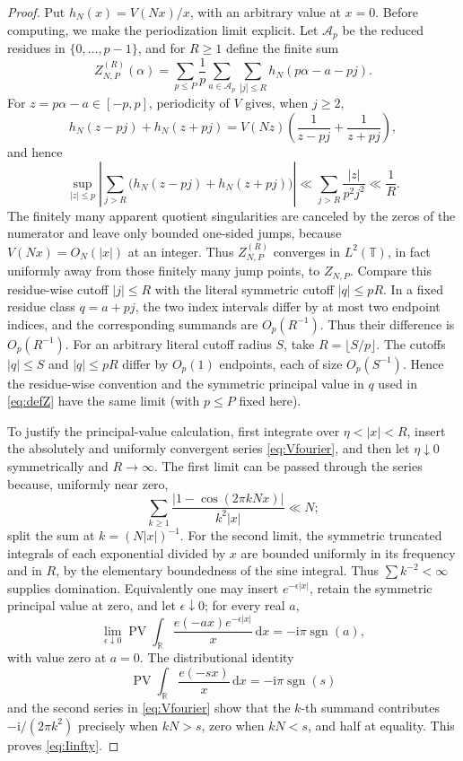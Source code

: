 \documentclass[11pt]{article}
\numberwithin{equation}{section}
\theoremstyle{definition}
\newcommand{\T}{\mathbb T}
\newcommand{\R}{\mathbb R}
\newcommand{\1}{\mathbf 1}
\newcommand{\ii}{\mathrm i}
\newcommand{\dd}{\,\mathrm d}
\newcommand{\PV}{\operatorname{PV}}
\newcommand{\sgn}{\operatorname{sgn}}
\begin{document}
\begin{proof}
Put \(h_N(x)=V(Nx)/x\), with an arbitrary value at \(x=0\).
Before computing, we make the periodization limit explicit.  Let
\(\mathcal A_p\) be the reduced residues in \(\{0,\ldots,p-1\}\), and
for \(R\ge1\) define the finite sum
\[
 Z_{N,P}^{(R)}(\alpha)=
 \sum_{p\le P}\frac1p
 \sum_{a\in\mathcal A_p}\sum_{|j|\le R}
 h_N(p\alpha-a-pj).
\]
For \(z=p\alpha-a\in[-p,p]\), periodicity of \(V\) gives, when
\(j\ge2\),
\[
 h_N(z-pj)+h_N(z+pj)
 =
 V(Nz)\left(\frac1{z-pj}+\frac1{z+pj}\right),
\]
and hence
\[
 \sup_{|z|\le p}
 \left|\sum_{j>R}\bigl(h_N(z-pj)+h_N(z+pj)\bigr)\right|
 \ll \sum_{j>R}\frac{|z|}{p^2j^2}
 \ll\frac1R.
\]
The finitely many apparent quotient singularities are canceled by the
zeros of the numerator and leave only bounded one-sided jumps, because
\(V(Nx)=O_N(|x|)\) at an integer.  Thus
\(Z_{N,P}^{(R)}\) converges in \(L^2(\T)\), in fact uniformly away
from those finitely many jump points, to \(Z_{N,P}\).  Compare this
residue-wise cutoff \(|j|\le R\) with the literal symmetric cutoff
\(|q|\le pR\).  In a fixed residue class \(q=a+pj\), the two index
intervals differ by at most two endpoint indices, and the corresponding
summands are \(O_p(R^{-1})\).  Thus their difference is \(O_p(R^{-1})\).
For an arbitrary literal cutoff radius \(S\), take
\(R=\lfloor S/p\rfloor\).  The cutoffs \(|q|\le S\) and
\(|q|\le pR\) differ by \(O_p(1)\) endpoints, each of size
\(O_p(S^{-1})\).  Hence the residue-wise convention and the symmetric
principal value in \(q\) used in \eqref{eq:defZ} have the same limit
(with \(p\le P\) fixed here).

To justify the principal-value calculation, first integrate over
\(\eta<|x|<R\), insert the absolutely and uniformly convergent series
\eqref{eq:Vfourier}, and then let \(\eta\downarrow0\) symmetrically and
\(R\to\infty\).  The first limit can be passed through the series because,
uniformly near zero,
\[
 \sum_{k\ge1}\frac{|1-\cos(2\pi kNx)|}{k^2|x|}\ll N;
\]
split the sum at \(k=(N|x|)^{-1}\).  For the second limit, the symmetric
truncated integrals of each exponential divided by \(x\) are bounded
uniformly in its frequency and in \(R\), by the elementary boundedness of
the sine integral.  Thus \(\sum k^{-2}<\infty\) supplies domination.
Equivalently one may insert \(e^{-\epsilon|x|}\), retain the symmetric
principal value at zero, and let \(\epsilon\downarrow0\); for every real
\(a\),
\[
 \lim_{\epsilon\downarrow0}
 \PV\int_{\R}\frac{e(-ax)e^{-\epsilon|x|}}x\dd x
 =-\ii\pi\sgn(a),
\]
with value zero at \(a=0\).
The distributional identity
\[
 \PV\int_{\R}\frac{e(-sx)}x\dd x=-\ii\pi\sgn(s)
\]
and the second series in \eqref{eq:Vfourier} show that the \(k\)-th
summand contributes \(-\ii/(2\pi k^2)\) precisely when \(kN>s\),
zero when \(kN<s\), and half at equality.  This proves
\eqref{eq:Iinfty}.


\end{proof}
\end{document}

